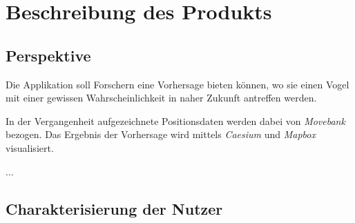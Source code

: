 \documentclass[12pt]{article} %
\begin{document}
\section{Beschreibung des Produkts}

\subsection{Perspektive}
Die Applikation soll Forschern eine Vorhersage bieten können, wo sie einen Vogel mit einer gewissen Wahrscheinlichkeit in naher Zukunft antreffen werden. 

In der Vergangenheit aufgezeichnete Positionsdaten werden dabei von \textit{Movebank} bezogen. Das Ergebnis der Vorhersage wird mittels \textit{Caesium} und \textit{Mapbox} visualisiert.





...

\subsection{Charakterisierung der Nutzer}




\end{document}
